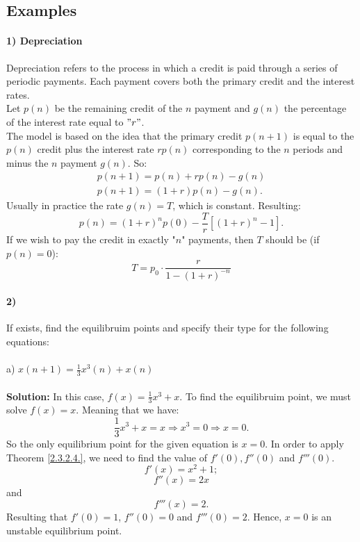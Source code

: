 \documentclass[a4paper, 11pt]{report}
\begin{document}
\subsection{Examples}

\paragraph{1) Depreciation}

Depreciation refers to the process in which a credit is paid through a series of periodic payments. Each payment covers both the primary credit and the interest rates.\\
Let $p(n)$ be the remaining credit of the $n$ payment and $g(n)$ the percentage of the interest rate equal to $"r"$. \\
The model is based on the idea that the primary credit $p(n+1)$ is equal to the $p(n)$ credit plus the interest rate $rp(n)$ corresponding to the $n$ periods and minus the $n$ payment $g(n)$. So:
\begin{align*}
 p(n+1)=p(n)+rp(n)-g(n)\\
 p(n+1)=(1+r)p(n)-g(n).
\end{align*}
Usually in practice the rate $g(n)=T$, which is constant. Resulting:
\begin{equation}
 p(n)=(1+r)^{n}p(0)-\frac{T}{r}[(1+r)^{n}-1].
\end{equation}
If we wish to pay the credit in exactly "$n$" payments, then $T$ should be (if $p(n)=0$):
$$T=p_{0}\cdot\frac{r}{1-(1+r)^{-n}}$$ 

\paragraph{2)} If exists, find the equilibruim points and specify their type for the following equations:\\ \\
a) $x(n+1)=\frac{1}{3}x^{3}(n)+x(n)$\\ \\
\textbf{Solution:}
In this case, $f(x)=\frac{1}{3}x^{3}+x$. To find the equilibruim point, we must solve $f(x)=x$. Meaning that we have:
$$\frac{1}{3} x^{3}+x=x \Rightarrow x^{3}=0 \Rightarrow x=0.$$
So the only equilibrium point for the given equation is $x=0$. In order to apply Theorem \ref{2.3.2.4.}, we need to find the value of $f'(0), f''(0)$ and $f'''(0).$ 
$$f'(x)=x^{2}+1;$$
$$f''(x)=2x$$ and
$$f'''(x)=2.$$
Resulting that $f'(0)=1$, $f''(0)=0$ and $f'''(0)=2$. Hence, $x=0$ is an unstable equilibrium point.\\
\end{document}
